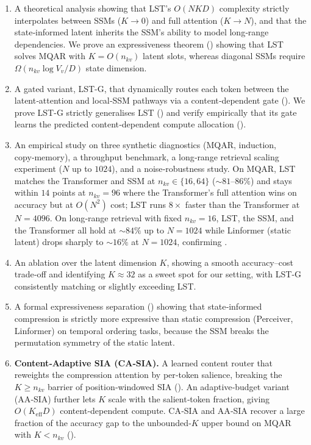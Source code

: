 \documentclass[10pt,twocolumn,letterpaper]{article}
\newcommand{\LST}{\textsc{LST}}
\newcommand{\SIA}{\textsc{SIA}}
\begin{document}
\begin{enumerate}[leftmargin=*,topsep=2pt,itemsep=1pt,resume]
\item A theoretical analysis showing that \LST{}'s $O(NKD)$ complexity strictly interpolates between SSMs ($K\!\to\!0$) and full attention ($K\!\to\!N$), and that the state‑informed latent inherits the SSM's ability to model long‑range dependencies.  We prove an expressiveness theorem () showing that \LST{} solves MQAR with $K\!=\!O(n_{kv})$ latent slots, whereas diagonal SSMs require $\Omega(n_{kv}\log V_v / D)$ state dimension.
\item A gated variant, \LST-G{}, that dynamically routes each token between the latent‑attention and local‑SSM pathways via a content‑dependent gate ().  We prove \LST-G{} strictly generalises \LST{} () and verify empirically that its gate learns the predicted content‑dependent compute allocation ().
\item An empirical study on three synthetic diagnostics (MQAR, induction, copy‑memory), a throughput benchmark, a long‑range retrieval scaling experiment ($N$ up to $1024$), and a noise‑robustness study.  On MQAR, \LST{} matches the Transformer and SSM at $n_{kv}\!\in\!\{16,64\}$ ($\sim\!81$--$86\%$) and stays within $14$ points at $n_{kv}\!=\!96$ where the Transformer's full attention wins on accuracy but at $O(N^2)$ cost; \LST{} runs $8\times$ faster than the Transformer at $N\!=\!4096$.  On long‑range retrieval with fixed $n_{kv}\!=\!16$, \LST{}, the SSM, and the Transformer all hold at $\sim\!84\%$ up to $N\!=\!1024$ while Linformer (static latent) drops sharply to $\sim\!16\%$ at $N\!=\!1024$, confirming .
\item An ablation over the latent dimension $K$, showing a smooth accuracy–cost trade‑off and identifying $K\!\approx\!32$ as a sweet spot for our setting, with \LST-G{} consistently matching or slightly exceeding \LST{}.
\item A formal expressiveness separation () showing that state‑informed compression is strictly more expressive than static compression (Perceiver, Linformer) on temporal ordering tasks, because the SSM breaks the permutation symmetry of the static latent.
\item \textbf{Content‑Adaptive \SIA{} (CA‑\SIA{}).}  A learned content router that reweights the compression attention by per‑token salience, breaking the $K\!\geq\!n_{kv}$ barrier of position‑windowed \SIA{} ().  An adaptive‑budget variant (AA‑\SIA{}) further lets $K$ scale with the salient‑token fraction, giving $O(K_{\mathrm{eff}}D)$ content‑dependent compute.  CA‑\SIA{} and AA‑\SIA{} recover a large fraction of the accuracy gap to the unbounded‑$K$ upper bound on MQAR with $K\!<\!n_{kv}$ ().
\end{enumerate}
\end{document}
